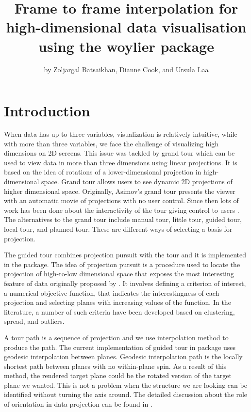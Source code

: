 \title{Frame to frame interpolation for high-dimensional data
visualisation using the woylier package}
\author{by Zoljargal Batsaikhan, Dianne Cook, and Ursula Laa}

\maketitle


\hypertarget{introduction}{%
\section{Introduction}\label{introduction}}

When data has up to three variables, visualization is relatively
intuitive, while with more than three variables, we face the challenge
of visualizing high dimensions on 2D screens. This issue was tackled by
grand tour \citet{asimov_1985} which can be used to view data in more
than three dimensions using linear projections. It is based on the idea
of rotations of a lower-dimensional projection in high-dimensional
space. Grand tour allows users to see dynamic 2D projections of higher
dimensional space. Originally, Asimov's grand tour presents the viewer
with an automatic movie of projections with no user control. Since then
lots of work has been done about the interactivity of the tour giving
control to users \citep{buja_cook_asimov_hurley_2005}. The alternatives
to the grand tour include manual tour, little tour, guided tour, local
tour, and planned tour. These are different ways of selecting a basis
for projection.

The guided tour combines projection pursuit with the tour
\citep{grandtour1995} and it is implemented in the 
package. The idea of projection pursuit is a procedure used to locate
the projection of high-to-low dimensional space that exposes the most
interesting feature of data originally proposed by \citet{kruskal_1969}.
It involves defining a criterion of interest, a numerical objective
function, that indicates the interestingness of each projection and
selecting planes with increasing values of the function. In the
literature, a number of such criteria have been developed based on
clustering, spread, and outliers.

A tour path is a sequence of projection and we use interpolation method
to produce the path. The current implementation of guided tour in
 package uses geodesic interpolation between planes.
Geodesic interpolation path is the locally shortest path between planes
with no within-plane spin. As a result of this method, the rendered
target plane could be the rotated version of the target plane we wanted.
This is not a problem when the structure we are looking can be
identified without turning the axis around. The detailed discussion
about the role of orientation in data projection can be found in
\citet{Buja2004TheoryOD}.

